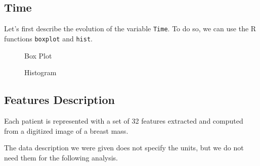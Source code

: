 \documentclass[]{report}
\begin{document}
\subsection{Time}
Let's first describe the evolution of the variable \texttt{Time}. To do so, we can use the R functions \texttt{boxplot} and \texttt{hist}.

\begin{figure}[!hb]
	\centering
	
	\caption{Box Plot}
\end{figure}

\begin{figure}[!hb]
	\centering
	
	\caption{Histogram}
\end{figure}

\subsection{Features Description}
Each patient is represented with a set of 32 features extracted and computed from a digitized image of a breast mass. 

The data description we were given does not specify the units, but we do not need them for the following analysis.
\end{document}
